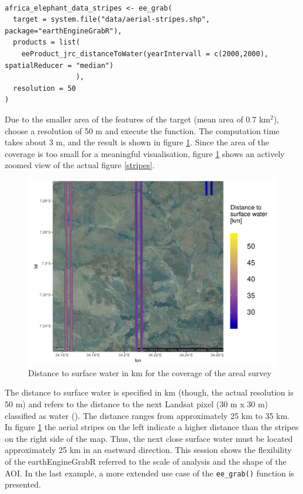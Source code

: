 \begin{lstlisting}

africa_elephant_data_stripes <- ee_grab(
  target = system.file("data/aerial-stripes.shp", package="earthEngineGrabR"), 
  products = list(
    eeProduct_jrc_distanceToWater(yearIntervall = c(2000,2000), spatialReducer = "median")
                 ),
  resolution = 50
)
\end{lstlisting}


Due to the smaller area of the features of the target (mean area of 0.7 km$^2$), choose a resolution of 50 m and execute the function. The computation time takes about 3 m, and the result is shown in figure \ref{session_2}. Since the area of the coverage is too small for a meaningful visualisation, figure \ref{session_2} shows an actively zoomed view of the actual figure \ref{stripes}. 

\begin{center}
	\begin{figure}[h]
		\begin{center}
			\includegraphics[width=15cm]{images/stripes_distance_2.pdf}
			\caption{Distance to surface water in km for the coverage of the areal survey}
			\label{session_2}
		\end{center}
	\end{figure}
\end{center}

The distance to surface water is specified in km (though, the actual resolution is 50 m) and refers to the distance to the next Landsat pixel (30 m x 30 m) classified as water (\cite{pekel2016high}). The distance ranges from approximately 25 km to 35 km. In figure \ref{session_2} the aerial stripes on the left indicate a higher distance than the stripes on the right side of the map. Thus, the next close surface water must be located approximately 25 km in an eastward direction. 
This session shows the flexibility of the earthEngineGrabR referred to the scale of analysis and the shape of the AOI.
In the last example, a more extended use case of the \texttt{ee\_grab()} function is presented.

